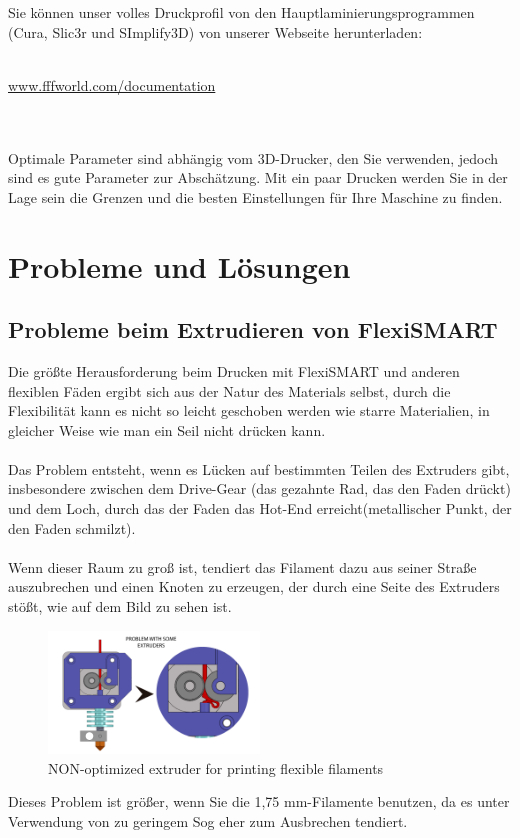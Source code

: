 \documentclass[11pt,a4paper]{article}
\begin{document}
Sie können unser volles Druckprofil von den Hauptlaminierungsprogrammen (Cura, Slic3r und SImplify3D) von unserer Webseite herunterladen:
\\\\
\centerline{ {\huge \url{www.fffworld.com/documentation} } }
\\\\
Optimale Parameter sind abhängig vom 3D-Drucker, den Sie verwenden, jedoch sind es gute Parameter zur Abschätzung. Mit ein paar Drucken werden Sie in der Lage sein die Grenzen und die besten Einstellungen für Ihre Maschine zu finden.
\section{Probleme und Lösungen}
	\subsection{Probleme beim Extrudieren von FlexiSMART}
Die größte Herausforderung beim Drucken mit FlexiSMART und anderen flexiblen Fäden ergibt sich aus der Natur des Materials selbst, durch die Flexibilität kann es nicht so leicht geschoben werden wie starre Materialien, in gleicher Weise wie man ein Seil nicht drücken kann.
\\\\
Das Problem entsteht, wenn es Lücken auf bestimmten Teilen des Extruders gibt, insbesondere zwischen dem Drive-Gear (das gezahnte Rad, das den Faden drückt) und dem Loch, durch das der Faden das Hot-End erreicht(metallischer Punkt, der den Faden schmilzt).
\\\\
Wenn dieser Raum zu groß ist, tendiert das Filament dazu aus seiner Straße auszubrechen und einen Knoten zu erzeugen, der durch eine Seite des Extruders stößt, wie auf dem Bild zu sehen ist.
\begin{figure}[H]
\centering
\includegraphics[width=0.5\textwidth,cfbox=azul_marcos 4pt 0pt]{FOTOS/NUDOS1}
\caption*{NON-optimized extruder for printing flexible filaments}
\end{figure}
Dieses Problem ist größer, wenn Sie die 1,75 mm-Filamente benutzen, da es unter Verwendung von zu geringem Sog eher zum Ausbrechen tendiert.
\end{document}
